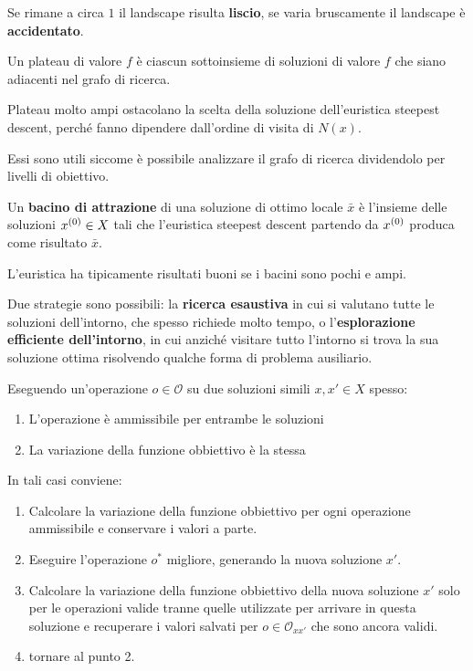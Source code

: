 \documentclass[\main/main.tex]{subfiles}
\begin{document}
\begin{multicols}{2}
\begin{definition}
    Se rimane a circa \(1\) il landscape risulta \textbf{liscio}, se varia bruscamente il landscape è \textbf{accidentato}.
\end{definition}
\begin{definition}[Plateau]
    Un plateau di valore \(f\) è ciascun sottoinsieme di soluzioni di valore \(f\) che siano adiacenti nel grafo di ricerca.
    
    Plateau molto ampi ostacolano la scelta della soluzione dell'euristica steepest descent, perché fanno dipendere dall'ordine di visita di \(N(x)\).
    
    Essi sono utili siccome è possibile analizzare il grafo di ricerca dividendolo per livelli di obiettivo.
\end{definition}
\begin{definition}
    Un \textbf{bacino di attrazione} di una soluzione di ottimo locale \(\bar{x}\) è l'insieme delle soluzioni \(x^{\left(0\right)} \in X\) tali che l'euristica steepest descent partendo da \(x^{\left(0\right)}\) produca come risultato \(\bar{x}\).
    
    L'euristica ha tipicamente risultati buoni se i bacini sono pochi e ampi.
\end{definition}
\begin{observation}
    Due strategie sono possibili: la \textbf{ricerca esaustiva} in cui si valutano tutte le soluzioni dell'intorno, che spesso richiede molto tempo, o l'\textbf{esplorazione efficiente dell'intorno}, in cui anziché visitare tutto l'intorno si trova la sua soluzione ottima risolvendo qualche forma di problema ausiliario.
\end{observation}
\begin{definition}
    Eseguendo un'operazione \(o \in \mathcal{O}\) su due soluzioni simili \(x, x' \in X\) spesso:
\begin{enumerate}
    \item L'operazione è ammissibile per entrambe le soluzioni
    \item La variazione della funzione obbiettivo è la stessa
\end{enumerate}
In tali casi conviene:
\begin{enumerate}
    \item Calcolare la variazione della funzione obbiettivo per ogni operazione ammissibile e conservare i valori a parte.
    \item Eseguire l'operazione \(o^*\) migliore, generando la nuova soluzione \(x'\).
    \item Calcolare la variazione della funzione obbiettivo della nuova soluzione \(x'\) solo per le operazioni valide tranne quelle utilizzate per arrivare in questa soluzione e recuperare i valori salvati per \(o \in \mathcal{O}_{xx'}\) che sono ancora validi.
    \item tornare al punto 2.
\end{enumerate}
\end{definition}
\end{multicols}
\end{document}
